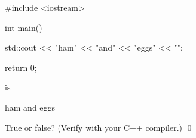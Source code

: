 \begin{console}
#include <iostream>

int main()
{
    std::cout << "ham" << "and" << "eggs"
              << "\n";
      
    return 0;
}
\end{console}
is
\begin{console}
ham and eggs
\end{console}
True or false? (Verify with your C++ compiler.)
\qed
